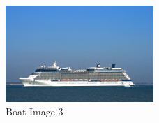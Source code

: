 \begin{figure}[h]
   \centering
   \includegraphics[width=0.5\textwidth]{../test-pictures/boat/boat3.jpg}
   \caption{Boat Image 3}
   \label{fig:boat3}
\end{figure}

